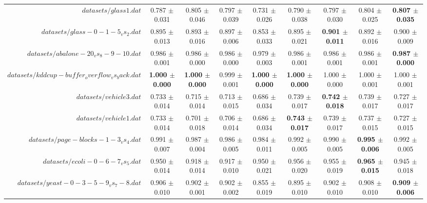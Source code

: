\begin{table}[!ht]
{\begin{tabular}{r c c c c c c c c}
$datasets/glass1.dat$ & 0.787 $\pm$ 0.031 & 0.805 $\pm$ 0.046 & 0.797 $\pm$ 0.039 & 0.731 $\pm$ 0.026 & 0.790 $\pm$ 0.038 & 0.797 $\pm$ 0.030 & 0.804 $\pm$ 0.025 & \textbf{0.807 $\pm$ 0.035} \\
$datasets/glass-0-1-5_vs_2.dat$ & 0.895 $\pm$ 0.013 & 0.893 $\pm$ 0.016 & 0.897 $\pm$ 0.006 & 0.853 $\pm$ 0.033 & 0.895 $\pm$ 0.021 & \textbf{0.901 $\pm$ 0.011} & 0.892 $\pm$ 0.016 & 0.900 $\pm$ 0.009 \\
$datasets/abalone-20_vs_8-9-10.dat$ & 0.986 $\pm$ 0.001 & 0.986 $\pm$ 0.000 & 0.986 $\pm$ 0.000 & 0.979 $\pm$ 0.003 & 0.986 $\pm$ 0.001 & 0.986 $\pm$ 0.001 & 0.986 $\pm$ 0.001 & \textbf{0.987 $\pm$ 0.000} \\
$datasets/kddcup-buffer_overflow_vs_back.dat$ & \textbf{1.000 $\pm$ 0.000} & \textbf{1.000 $\pm$ 0.000} & 0.999 $\pm$ 0.001 & \textbf{1.000 $\pm$ 0.000} & \textbf{1.000 $\pm$ 0.000} & 1.000 $\pm$ 0.000 & 1.000 $\pm$ 0.001 & 1.000 $\pm$ 0.001 \\
$datasets/vehicle3.dat$ & 0.733 $\pm$ 0.014 & 0.715 $\pm$ 0.014 & 0.713 $\pm$ 0.015 & 0.686 $\pm$ 0.034 & 0.739 $\pm$ 0.017 & \textbf{0.742 $\pm$ 0.018} & 0.739 $\pm$ 0.017 & 0.727 $\pm$ 0.017 \\
$datasets/vehicle1.dat$ & 0.733 $\pm$ 0.014 & 0.701 $\pm$ 0.018 & 0.706 $\pm$ 0.014 & 0.686 $\pm$ 0.034 & \textbf{0.743 $\pm$ 0.017} & 0.739 $\pm$ 0.017 & 0.737 $\pm$ 0.015 & 0.727 $\pm$ 0.015 \\
$datasets/page-blocks-1-3_vs_4.dat$ & 0.991 $\pm$ 0.007 & 0.987 $\pm$ 0.004 & 0.986 $\pm$ 0.005 & 0.984 $\pm$ 0.011 & 0.992 $\pm$ 0.005 & 0.990 $\pm$ 0.005 & \textbf{0.995 $\pm$ 0.006} & 0.992 $\pm$ 0.005 \\
$datasets/ecoli-0-6-7_vs_5.dat$ & 0.950 $\pm$ 0.014 & 0.918 $\pm$ 0.014 & 0.917 $\pm$ 0.010 & 0.950 $\pm$ 0.021 & 0.956 $\pm$ 0.020 & 0.955 $\pm$ 0.019 & \textbf{0.965 $\pm$ 0.015} & 0.945 $\pm$ 0.018 \\
$datasets/yeast-0-3-5-9_vs_7-8.dat$ & 0.906 $\pm$ 0.010 & 0.902 $\pm$ 0.001 & 0.902 $\pm$ 0.002 & 0.855 $\pm$ 0.019 & 0.895 $\pm$ 0.010 & 0.902 $\pm$ 0.010 & 0.908 $\pm$ 0.010 & \textbf{0.909 $\pm$ 0.006} \\
\end{tabular}}
\end{table}
